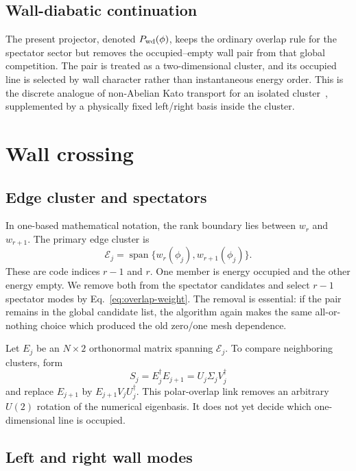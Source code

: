 \documentclass[aps,prb,twocolumn,floatfix,nofootinbib,superscriptaddress]{revtex4-2}
\begin{document}
\subsection{Wall-diabatic continuation}

The present projector, denoted $P_{\rm wd}(\phi)$, keeps the ordinary overlap
rule for the spectator sector but removes the occupied--empty wall pair from
that global competition.  The pair is treated as a two-dimensional cluster,
and its occupied line is selected by wall character rather than instantaneous
energy order.  This is the discrete analogue of non-Abelian Kato transport
for an isolated cluster~\cite{Kato1950}, supplemented by a physically fixed
left/right basis inside the cluster.

\section{Wall crossing}

\subsection{Edge cluster and spectators}

In one-based mathematical notation, the rank boundary lies between $w_r$ and
$w_{r+1}$.  The primary edge cluster is
\begin{equation}
 \mathcal E_j=\operatorname{span}\{w_r(\phi_j),w_{r+1}(\phi_j)\}.
 \label{eq:edge-cluster}
\end{equation}
These are code indices $r-1$ and $r$.  One member is energy occupied and the
other energy empty.  We remove both from the spectator candidates and select
$r-1$ spectator modes by Eq.~\eqref{eq:overlap-weight}.  The removal is
essential: if the pair remains in the global candidate list, the algorithm
again makes the same all-or-nothing choice which produced the old zero/one
mesh dependence.

Let $E_j$ be an $N\times2$ orthonormal matrix spanning $\mathcal E_j$.  To
compare neighboring clusters, form
\begin{equation}
 S_j=E_j^\dagger E_{j+1}=U_j\Sigma_jV_j^\dagger
 \label{eq:polar-link}
\end{equation}
and replace $E_{j+1}$ by $E_{j+1}V_jU_j^\dagger$.  This polar-overlap link
removes an arbitrary $U(2)$ rotation of the numerical eigenbasis.  It does
not yet decide which one-dimensional line is occupied.

\subsection{Left and right wall modes}
\end{document}
